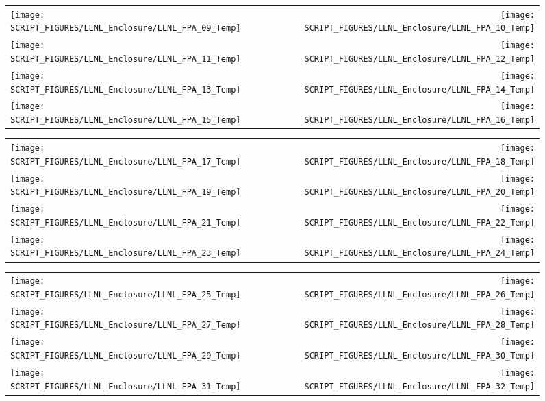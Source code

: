 \begin{figure}[!ht]
\begin{tabular*}{\textwidth}{l@{\extracolsep{\fill}}r}
\texttt{[image: SCRIPT\_FIGURES/LLNL\_Enclosure/LLNL\_FPA\_09\_Temp]} &
\texttt{[image: SCRIPT\_FIGURES/LLNL\_Enclosure/LLNL\_FPA\_10\_Temp]} \\
\texttt{[image: SCRIPT\_FIGURES/LLNL\_Enclosure/LLNL\_FPA\_11\_Temp]} &
\texttt{[image: SCRIPT\_FIGURES/LLNL\_Enclosure/LLNL\_FPA\_12\_Temp]} \\
\texttt{[image: SCRIPT\_FIGURES/LLNL\_Enclosure/LLNL\_FPA\_13\_Temp]} &
\texttt{[image: SCRIPT\_FIGURES/LLNL\_Enclosure/LLNL\_FPA\_14\_Temp]} \\
\texttt{[image: SCRIPT\_FIGURES/LLNL\_Enclosure/LLNL\_FPA\_15\_Temp]} &
\texttt{[image: SCRIPT\_FIGURES/LLNL\_Enclosure/LLNL\_FPA\_16\_Temp]}
\end{tabular*}
\end{figure}

\begin{figure}[!ht]
\begin{tabular*}{\textwidth}{l@{\extracolsep{\fill}}r}
\texttt{[image: SCRIPT\_FIGURES/LLNL\_Enclosure/LLNL\_FPA\_17\_Temp]} &
\texttt{[image: SCRIPT\_FIGURES/LLNL\_Enclosure/LLNL\_FPA\_18\_Temp]} \\
\texttt{[image: SCRIPT\_FIGURES/LLNL\_Enclosure/LLNL\_FPA\_19\_Temp]} &
\texttt{[image: SCRIPT\_FIGURES/LLNL\_Enclosure/LLNL\_FPA\_20\_Temp]} \\
\texttt{[image: SCRIPT\_FIGURES/LLNL\_Enclosure/LLNL\_FPA\_21\_Temp]} &
\texttt{[image: SCRIPT\_FIGURES/LLNL\_Enclosure/LLNL\_FPA\_22\_Temp]} \\
\texttt{[image: SCRIPT\_FIGURES/LLNL\_Enclosure/LLNL\_FPA\_23\_Temp]} &
\texttt{[image: SCRIPT\_FIGURES/LLNL\_Enclosure/LLNL\_FPA\_24\_Temp]}
\end{tabular*}
\end{figure}

\begin{figure}[!ht]
\begin{tabular*}{\textwidth}{l@{\extracolsep{\fill}}r}
\texttt{[image: SCRIPT\_FIGURES/LLNL\_Enclosure/LLNL\_FPA\_25\_Temp]} &
\texttt{[image: SCRIPT\_FIGURES/LLNL\_Enclosure/LLNL\_FPA\_26\_Temp]} \\
\texttt{[image: SCRIPT\_FIGURES/LLNL\_Enclosure/LLNL\_FPA\_27\_Temp]} &
\texttt{[image: SCRIPT\_FIGURES/LLNL\_Enclosure/LLNL\_FPA\_28\_Temp]} \\
\texttt{[image: SCRIPT\_FIGURES/LLNL\_Enclosure/LLNL\_FPA\_29\_Temp]} &
\texttt{[image: SCRIPT\_FIGURES/LLNL\_Enclosure/LLNL\_FPA\_30\_Temp]} \\
\texttt{[image: SCRIPT\_FIGURES/LLNL\_Enclosure/LLNL\_FPA\_31\_Temp]} &
\texttt{[image: SCRIPT\_FIGURES/LLNL\_Enclosure/LLNL\_FPA\_32\_Temp]}
\end{tabular*}
\end{figure}

